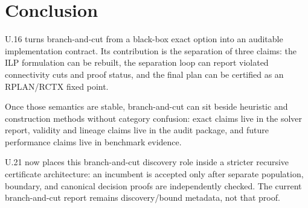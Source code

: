 \section{Conclusion}

U.16 turns branch-and-cut from a black-box exact option into an auditable
implementation contract. Its contribution is the separation of three claims:
the ILP formulation can be rebuilt, the separation loop can report violated
connectivity cuts and proof status, and the final plan can be certified as an
RPLAN/RCTX fixed point.

Once those semantics are stable, branch-and-cut can sit beside heuristic and
construction methods without category confusion: exact claims live in the solver
report, validity and lineage claims live in the audit package, and future
performance claims live in benchmark evidence.

U.21 now places this branch-and-cut discovery role inside a stricter recursive
certificate architecture: an incumbent is accepted only after separate
population, boundary, and canonical decision proofs are independently checked.
The current branch-and-cut report remains discovery/bound metadata, not that
proof.
